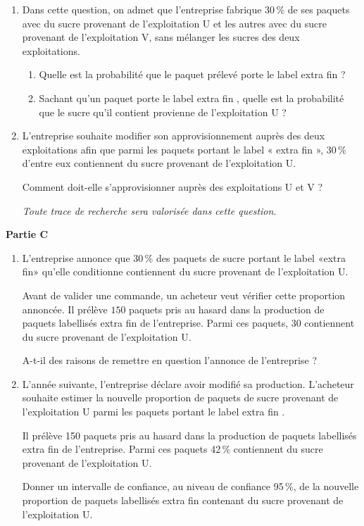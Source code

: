 \documentclass[10pt]{article}
\begin{document}
\medskip
 
\begin{enumerate}
\item Dans cette question, on admet que l'entreprise fabrique 30\,\% de ses paquets avec du sucre
provenant de l'exploitation U et les autres avec du sucre provenant de l'exploitation V,
sans mélanger les sucres des deux exploitations.
	\begin{enumerate}
		\item Quelle est la probabilité que le paquet prélevé porte le label \og extra fin \fg{} ?
		\item Sachant qu'un paquet porte le label \og extra fin \fg, quelle est la probabilité que le sucre
qu'il contient provienne de l'exploitation U ?
 	\end{enumerate}
\item L'entreprise souhaite modifier son approvisionnement auprès des deux exploitations afin
que parmi les paquets portant le label « extra fin », 30\,\% d'entre eux contiennent du sucre
provenant de l'exploitation U.
	
Comment doit-elle s'approvisionner auprès des exploitations U et V ?
	
\emph{Toute trace de recherche sera valorisée dans cette question}.
\end{enumerate}

\bigskip

\textbf{Partie C}

\medskip

\begin{enumerate}
\item L'entreprise annonce que 30\,\% des paquets de sucre portant le label «extra fin» qu'elle
conditionne contiennent du sucre provenant de l'exploitation U.

Avant de valider une commande, un acheteur veut vérifier cette proportion annoncée. Il
prélève $150$ paquets pris au hasard dans la production de paquets labellisés \og extra fin \fg{} de
l'entreprise. Parmi ces paquets, $30$ contiennent du sucre provenant de l'exploitation U.

A-t-il des raisons de remettre en question l'annonce de l'entreprise ?
\item  L'année suivante, l'entreprise déclare avoir modifié sa production. L'acheteur souhaite
estimer la nouvelle proportion de paquets de sucre provenant de l'exploitation U parmi les
paquets portant le label \og extra fin \fg. 

Il prélève 150 paquets pris au hasard dans la production de paquets labellisés \og extra fin \fg{} de l'entreprise. Parmi ces paquets 42\,\% contiennent du sucre provenant de l'exploitation U.

Donner un intervalle de confiance, au niveau de confiance 95\,\%, de la nouvelle proportion
de paquets labellisés \og extra fin \fg{} contenant du sucre provenant de l'exploitation U.
\end{enumerate}
\end{document}
